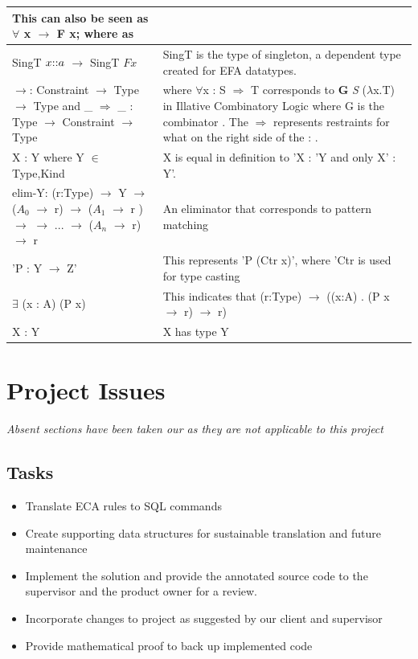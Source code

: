 \documentclass[12pt]{report}
\begin{document}
\begin{longtable}{|m{5cm}|m{9cm}| }
        This can also be seen as $\forall$ x $\rightarrow$ F x; where as  \\ 
        \hline
           SingT \(x $::$ a\) $\rightarrow$ SingT \(F x\)  &  SingT is the type 
           of singleton, a dependent type created for EFA datatypes. \\ 
        \hline
          $\rightarrow$: Constraint $\rightarrow$ Type $\rightarrow$ Type  and  
          \_ $\Rightarrow$ \_ : Type $\rightarrow$ Constraint $\rightarrow$ 
          Type    &  where $\forall$x : S $\Rightarrow$ T corresponds to 
          $\mathbf{G}$ \textit{S} ($\lambda$x.T) in Illative Combinatory 
          Logic 
          where G is the combinator \cite{CombLogic}. The $\Rightarrow$ 
          represents restraints for what on the right side of the : .\\ 
        \hline
        X : Y  where Y $\in$ {Type,Kind} &  X is equal in definition to 'X : 'Y 
        and only X' : Y'. \\ 
        \hline
        elim-Y: (r:Type) $\rightarrow$ Y $\rightarrow$ ($A_0$ $\rightarrow$ r) 
        $\rightarrow$ ($A_1$ $\rightarrow$ r ) $\rightarrow$ $\rightarrow$ 
        $...$ $\rightarrow$ ($A_n$ $\rightarrow$ r) $\rightarrow$ r   &  An 
        eliminator that corresponds to pattern matching \\ 
        \hline
        'P : Y $\rightarrow$ Z'   &  This represents 'P (Ctr x)', where 'Ctr  
        is used for type casting\\ 
        \hline
         $\exists$ (x : A) (P x) & This indicates that (r:Type) $\rightarrow$ 
         ((x:A) . (P x $\rightarrow$ r) $\rightarrow$ r) \\ 
        \hline
        X : Y   &  X has type Y \\ 
        \hline
        
\end{longtable}
\textit{}

\chapter{Project Issues}\label{ch:issues}
\textit{Absent sections have been taken our as they are not applicable to this 
project}

\section{Tasks}\label{sec:Tasks}
\begin{itemize}
\item Translate ECA rules to SQL commands
\item Create supporting data structures for sustainable translation and future 
maintenance
\item Implement the solution and provide the  annotated source code to the supervisor and the product owner for a review.
\item Incorporate changes to project as suggested by our client and supervisor
\item Provide mathematical proof to back up implemented code
\end{itemize}
%
\end{document}
